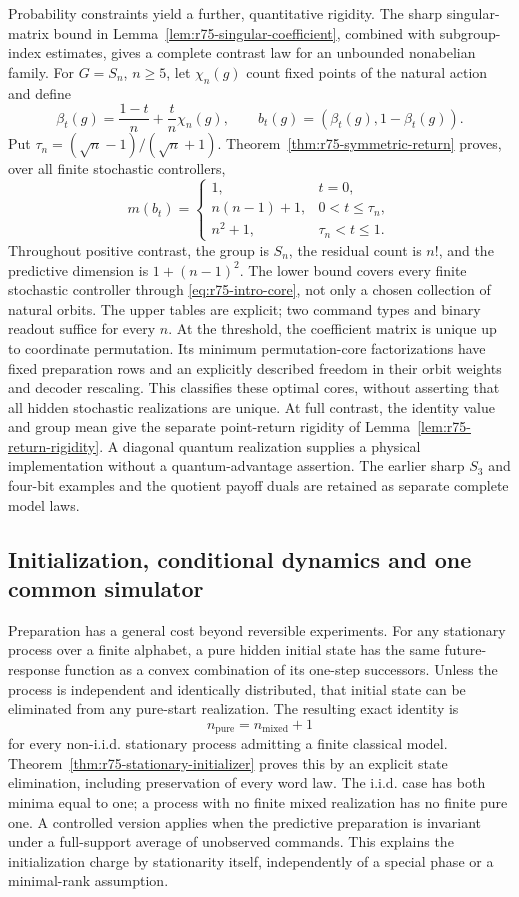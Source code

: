Probability constraints yield a further, quantitative rigidity. The sharp
singular-matrix bound in Lemma~\ref{lem:r75-singular-coefficient}, combined
with subgroup-index estimates, gives a complete contrast law for an
unbounded nonabelian family. For $G=S_n$, $n\ge5$, let
$\chi_n(g)$ count fixed points of the natural action and define
\[
 \beta_t(g)=\frac{1-t}{n}+\frac{t}{n}\chi_n(g),\qquad
 b_t(g)=(\beta_t(g),1-\beta_t(g)).
\]
Put $\tau_n=(\sqrt n-1)/(\sqrt n+1)$. Theorem~\ref{thm:r75-symmetric-return}
proves, over all finite stochastic controllers,
\[
 m(b_t)=
 \begin{cases}
 1,&t=0,\\
 n(n-1)+1,&0<t\le\tau_n,\\
 n^2+1,&\tau_n<t\le1.
 \end{cases}
\]
Throughout positive contrast, the group is $S_n$, the residual count is
$n!$, and the predictive dimension is $1+(n-1)^2$. The lower bound covers
every finite stochastic controller through \eqref{eq:r75-intro-core}, not
only a chosen collection of natural orbits. The upper tables are explicit;
two command types and binary readout suffice for every $n$. At the
threshold, the coefficient matrix is unique up to coordinate permutation.
Its minimum permutation-core factorizations have fixed preparation rows
and an explicitly described freedom in their orbit weights and decoder
rescaling. This classifies these optimal cores, without asserting that
all hidden stochastic realizations are unique. At full contrast, the
identity value and group mean give the separate point-return rigidity of
Lemma~\ref{lem:r75-return-rigidity}. A diagonal quantum realization supplies
a physical implementation without a quantum-advantage assertion.
The earlier sharp $S_3$ and four-bit examples and the quotient payoff
duals are retained as separate complete model laws.

\subsection*{Initialization, conditional dynamics and one common simulator}
Preparation has a general cost beyond reversible experiments. For any
stationary process over a finite alphabet, a pure hidden initial state has
the same future-response function as a convex combination of its
one-step successors. Unless the process is independent and identically
distributed, that initial state can be eliminated from any pure-start
realization. The resulting exact identity is
\[
 n_{\mathrm{pure}}=n_{\mathrm{mixed}}+1
\]
for every non-i.i.d. stationary process admitting a finite classical model.
Theorem~\ref{thm:r75-stationary-initializer} proves this by an explicit state elimination, including
preservation of every word law. The i.i.d. case has both minima equal to
one; a process with no finite mixed realization has no finite pure one.
A controlled version applies when the predictive preparation is invariant
under a full-support average of unobserved commands. This explains the
initialization charge by stationarity itself, independently of a special
phase or a minimal-rank assumption.

